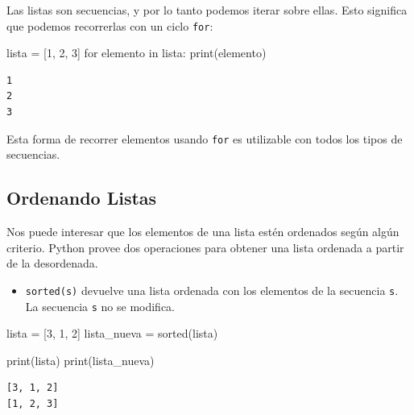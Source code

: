 \documentclass[
  letterpaper,
  DIV=11,
  numbers=noendperiod]{scrreprt}
\newenvironment{Shaded}{\begin{snugshade}}{\end{snugshade}}
\newcommand{\BuiltInTok}[1]{\textcolor[rgb]{0.00,0.23,0.31}{#1}}
\newcommand{\ControlFlowTok}[1]{\textcolor[rgb]{0.00,0.23,0.31}{#1}}
\newcommand{\DecValTok}[1]{\textcolor[rgb]{0.68,0.00,0.00}{#1}}
\newcommand{\KeywordTok}[1]{\textcolor[rgb]{0.00,0.23,0.31}{#1}}
\newcommand{\NormalTok}[1]{\textcolor[rgb]{0.00,0.23,0.31}{#1}}
\newcommand{\OperatorTok}[1]{\textcolor[rgb]{0.37,0.37,0.37}{#1}}
\providecommand{\tightlist}{%
  \setlength{\itemsep}{0pt}\setlength{\parskip}{0pt}}\usepackage{longtable,booktabs,array}
\begin{document}
Las listas son secuencias, y por lo tanto podemos iterar sobre ellas.
Esto significa que podemos recorrerlas con un ciclo \texttt{for}:

\begin{Shaded}
\begin{Highlighting}[]
\NormalTok{lista }\OperatorTok{=}\NormalTok{ [}\DecValTok{1}\NormalTok{, }\DecValTok{2}\NormalTok{, }\DecValTok{3}\NormalTok{]}
\ControlFlowTok{for}\NormalTok{ elemento }\KeywordTok{in}\NormalTok{ lista:}
    \BuiltInTok{print}\NormalTok{(elemento)}
\end{Highlighting}
\end{Shaded}

\begin{verbatim}
1
2
3
\end{verbatim}

Esta forma de recorrer elementos usando \texttt{for} es utilizable con
todos los tipos de secuencias.

\hypertarget{ordenando-listas}{%
\subsection{Ordenando Listas}\label{ordenando-listas}}

Nos puede interesar que los elementos de una lista estén ordenados según
algún criterio. Python provee dos operaciones para obtener una lista
ordenada a partir de la desordenada.

\begin{itemize}
\tightlist
\item
  \texttt{sorted(s)} devuelve una lista ordenada con los elementos de la
  secuencia \texttt{s}. La secuencia \texttt{s} no se modifica.
\end{itemize}

\begin{Shaded}
\begin{Highlighting}[]
\NormalTok{lista }\OperatorTok{=}\NormalTok{ [}\DecValTok{3}\NormalTok{, }\DecValTok{1}\NormalTok{, }\DecValTok{2}\NormalTok{]}
\NormalTok{lista\_nueva }\OperatorTok{=} \BuiltInTok{sorted}\NormalTok{(lista)}

\BuiltInTok{print}\NormalTok{(lista)}
\BuiltInTok{print}\NormalTok{(lista\_nueva)}
\end{Highlighting}
\end{Shaded}

\begin{verbatim}
[3, 1, 2]
[1, 2, 3]
\end{verbatim}
\end{document}
